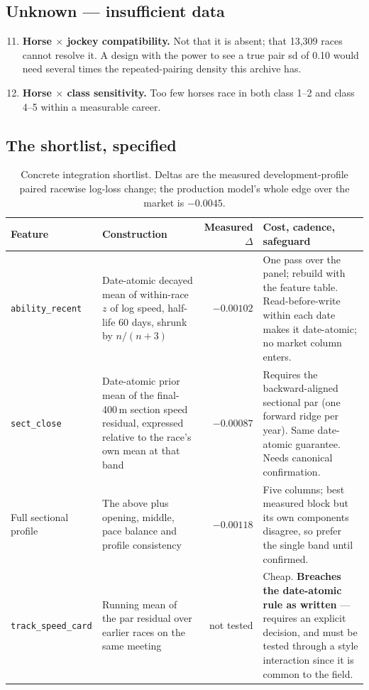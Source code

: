 \documentclass[11pt,a4paper]{article}
\begin{document}
\subsection*{Unknown --- insufficient data}

\begin{enumerate}\setcounter{enumi}{10}\itemsep3pt
\item \textbf{Horse $\times$ jockey compatibility.} Not that it is absent; that
13{,}309 races cannot resolve it. A design with the power to see a true pair sd of
0.10 would need several times the repeated-pairing density this archive has.
\item \textbf{Horse $\times$ class sensitivity.} Too few horses race in both
class 1--2 and class 4--5 within a measurable career.
\end{enumerate}

\subsection*{The shortlist, specified}

\begin{table}[htbp]\centering\small
\caption{Concrete integration shortlist. Deltas are the measured development-profile
paired racewise log-loss change; the production model's whole edge over the market
is $-0.0045$.}
\begin{tabular}{@{}p{}p{}rp{}@{}}
\toprule
Feature & Construction & Measured $\Delta$ & Cost, cadence, safeguard\\
\midrule
\texttt{ability\_recent} &
Date-atomic decayed mean of within-race $z$ of log speed, half-life 60 days,
shrunk by $n/(n+3)$ &
$-0.00102$ &
One pass over the panel; rebuild with the feature table. Read-before-write within
each date makes it date-atomic; no market column enters.\\[4pt]
\texttt{sect\_close} &
Date-atomic prior mean of the final-400\,m section speed residual, expressed
relative to the race's own mean at that band &
$-0.00087$ &
Requires the backward-aligned sectional par (one forward ridge per year). Same
date-atomic guarantee. Needs canonical confirmation.\\[4pt]
Full sectional profile &
The above plus opening, middle, pace balance and profile consistency &
$-0.00118$ &
Five columns; best measured block but its own components disagree, so prefer the
single band until confirmed.\\[4pt]
\texttt{track\_speed\_card} &
Running mean of the par residual over earlier races on the same meeting &
not tested &
Cheap. \textbf{Breaches the date-atomic rule as written} --- requires an explicit
decision, and must be tested through a style interaction since it is common to the
field.\\
\bottomrule
\end{tabular}
\end{table}
\end{document}
